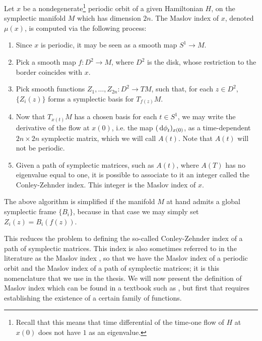 Let $x$ be a nondegenerate\footnote{Recall that this means that time differential of the time-one flow of $H$ at $x(0)$ does not have $1$ as an eigenvalue.} periodic orbit of a given Hamiltonian $H$, on the symplectic manifold $M$ which has dimension $2n$. The Maslov index of $x$, denoted $\mu(x)$, is computed via the following process:
\begin{algorithm}\label{alg:maslovalg}
\begin{enumerate}[algorithm]
\item\label{maslovalg:step1} Since $x$ is periodic, it may be seen as a smooth map $S^1 \to M$.
\item\label{maslovalg:step2} Pick a smooth map $f \colon D^2 \to M$, where $D^2$ is the disk, whose restriction to the border coincides with $x$.
\item\label{maslovalg:step3} Pick smooth functions $Z_1, \dots, Z_{2n} \colon D^2 \to TM$, such that, for each $z \in D^2$, $\{Z_i(z)\}$ forms a symplectic basis for $T_{f(z)} M$.
\item\label{maslovalg:step4} Now that $T_{x(t)} M$ has a chosen basis for each $t \in S^1$, we may write the derivative of the flow at $x(0)$, i.e. the map $(\dl \phi_t)_{x(0)}$, as a time-dependent $2n \times 2n$ symplectic matrix, which we will call $A(t)$. Note that $A(t)$ will not be periodic.
\item\label{maslovalg:step5} Given a path of symplectic matrices, such as $A(t)$, where $A(T)$ has no eigenvalue equal to one, it is possible to associate to it an integer called the Conley-Zehnder index. This integer is the Maslov index of $x$.
\end{enumerate}
\end{algorithm}

\begin{remark}
The above algorithm is simplified if the manifold $M$ at hand admits a global symplectic frame $\{B_i\}$, because in that case we may simply set $Z_i(z) = B_i(f(z))$.
\end{remark}

This reduces the problem to defining the so-called Conley-Zehnder index of a path of symplectic matrices. This index is also sometimes referred to in the literature as the Maslov index \cite{audin}, so that we have the Maslov index of a periodic orbit and the Maslov index of a path of symplectic matrices; it is this nomenclature that we use in the thesis. We will now present the definition of Maslov index which can be found in a textbook such as \cite{audin}, but first that requires establishing the existence of a certain family of functions.


